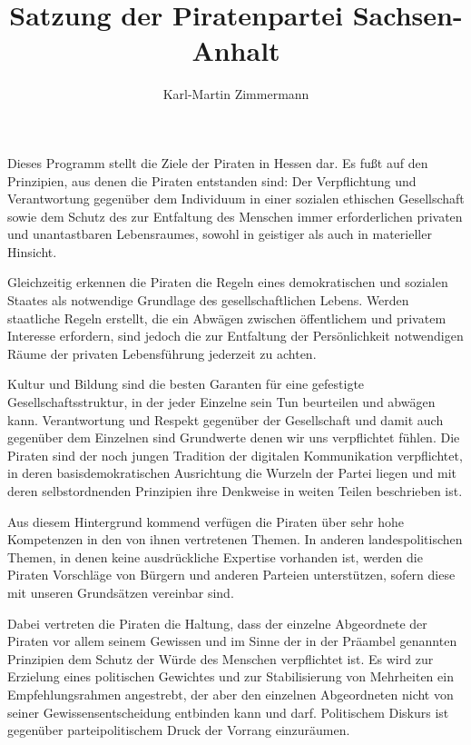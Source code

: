 \documentclass[10pt,a4paper,twocolumn,twoside,titlepage]{article}
\author{Karl-Martin Zimmermann}
\title{Satzung der Piratenpartei Sachsen-Anhalt}
\begin{document}
\maketitle

\begin{firstpage}
Dieses Programm stellt die Ziele der Piraten in Hessen dar. Es fußt auf den Prinzipien, aus denen die Piraten entstanden sind: Der Verpflichtung und Verantwortung gegenüber dem Individuum in einer sozialen ethischen Gesellschaft sowie dem Schutz des zur Entfaltung des Menschen immer erforderlichen privaten und unantastbaren Lebensraumes, sowohl in geistiger als auch in materieller Hinsicht.

Gleichzeitig erkennen die Piraten die Regeln eines demokratischen und sozialen Staates als notwendige Grundlage des gesellschaftlichen Lebens. Werden staatliche Regeln erstellt, die ein Abwägen zwischen öffentlichem und privatem Interesse erfordern, sind jedoch die zur Entfaltung der Persönlichkeit notwendigen Räume der privaten Lebensführung jederzeit zu achten.

Kultur und Bildung sind die besten Garanten für eine gefestigte Gesellschaftsstruktur, in der jeder Einzelne sein Tun beurteilen und abwägen kann. Verantwortung und Respekt gegenüber der Gesellschaft und damit auch gegenüber dem Einzelnen sind Grundwerte denen wir uns verpflichtet fühlen.
Die Piraten sind der noch jungen Tradition der digitalen Kommunikation verpflichtet, in deren basisdemokratischen Ausrichtung die Wurzeln der Partei liegen und mit deren selbstordnenden Prinzipien ihre Denkweise in weiten Teilen beschrieben ist.

Aus diesem Hintergrund kommend verfügen die Piraten über sehr hohe Kompetenzen in den von ihnen vertretenen Themen. In anderen landespolitischen Themen, in denen keine ausdrückliche Expertise vorhanden ist, werden die Piraten Vorschläge von Bürgern und anderen Parteien unterstützen, sofern diese mit unseren Grundsätzen vereinbar sind.

Dabei vertreten die Piraten die Haltung, dass der einzelne Abgeordnete der Piraten vor allem seinem Gewissen und im Sinne der in der Präambel genannten Prinzipien dem Schutz der Würde des Menschen verpflichtet ist. Es wird zur Erzielung eines politischen Gewichtes und zur Stabilisierung von Mehrheiten ein Empfehlungsrahmen angestrebt, der aber den einzelnen Abgeordneten nicht von seiner Gewissensentscheidung entbinden kann und darf. Politischem Diskurs ist gegenüber parteipolitischem Druck der Vorrang einzuräumen.
\end{firstpage}
\end{document}
